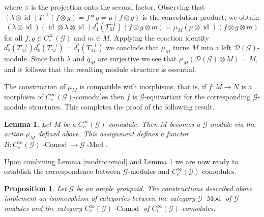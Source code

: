 \documentclass{amsart}
\newtheorem{lemma}[thm]{Lemma}
\newtheorem{prop}[thm]{Proposition}
\newcommand{\G}{\mathcal{G}}
\newcommand{\DG}{\mathcal{D}(\mathcal{G})}
\newcommand{\ccinfty}{C_c^\infty}
\DeclareMathOperator{\id}{id}
\begin{document}
where $ \pi $ is the projection onto the second factor. Observing that $ (\lambda \otimes \id)T^{-1}(f \otimes g) = f * g = \mu(f\otimes g) $ is the convolution product, 
we obtain
$$
(\lambda \otimes \id)(\id \otimes \lambda \otimes \id) d_1^*(T^{-1}_M) (f \otimes g \otimes m) %
= \mu_M(\mu \otimes \id)(f \otimes g \otimes m)
$$
for all $ f,g \in \ccinfty(\G) $ and $ m \in M $. Applying the coaction identity $ d_2^*(T^{-1}_M)d_0^*(T^{-1}_M) = d_1^*(T^{-1}_M) $ we conclude that $ \mu_M $ turns $ M $ into a 
left $ \DG $-module. Since both $ \lambda $ and $ q_M $ are surjective we see that $ \mu_M(\DG \otimes M) = M $, and it follows that the resulting module structure is essential. 

The construction of $ \mu_M $ is compatible with morphisms, that is, if $ f: M \rightarrow N $ is a morphism of $ \ccinfty(\G) $-comodules then $ f $ is $ \G $-equivariant for the corresponding $ \G $-module structures. This completes the proof of the following result.

\begin{lemma} \label{comodtomod}
Let $ M $ be a $ \ccinfty(\G) $-comodule. Then $ M $ becomes a $ \G $-module via the action $ \mu_M $ defined above. This assignment defines a functor $ B: \ccinfty(\G) \operatorname{-Comod} \rightarrow \G \operatorname{-Mod} $. 
\end{lemma}

Upon combining Lemma \ref{modtocomod} and Lemma \ref{comodtomod} we are now ready to establish the correspondence between $ \G $-modules and $ \ccinfty(\G) $-comodules. 

\begin{prop} \label{theorem: unification theorem} 
Let $ \G $ be an ample groupoid. The constructions described above implement an isomorphism of categories between the category $ \G \operatorname{-Mod} $ of $ \G $-modules and the category $ \ccinfty(\G) \operatorname{-Comod} $ of $ \ccinfty(\G) $-comodules. 
\end{prop}
\end{document}
